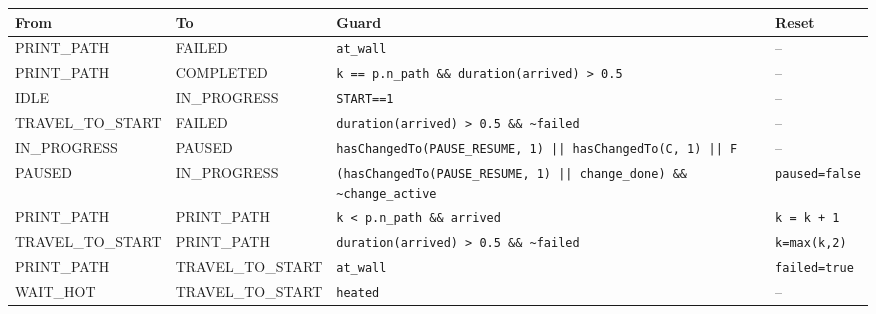 \begin{tabular}{@{}llp{}p{}@{}}
\toprule
From & To & Guard & Reset \\
\midrule
PRINT\_PATH & FAILED & \texttt{at\_wall} & -- \\
PRINT\_PATH & COMPLETED & \texttt{k == p.n\_path \&\& duration(arrived) > 0.5} & -- \\
IDLE & IN\_PROGRESS & \texttt{START==1} & -- \\
TRAVEL\_TO\_START & FAILED & \texttt{duration(arrived) > 0.5 \&\& \textasciitilde{}failed} & -- \\
IN\_PROGRESS & PAUSED & \texttt{hasChangedTo(PAUSE\_RESUME, 1) || hasChangedTo(C, 1) || F} & -- \\
PAUSED & IN\_PROGRESS & \texttt{(hasChangedTo(PAUSE\_RESUME, 1) || change\_done) \&\& \textasciitilde{}change\_active} & \texttt{paused=false} \\
PRINT\_PATH & PRINT\_PATH & \texttt{k < p.n\_path \&\& arrived} & \texttt{k = k + 1} \\
TRAVEL\_TO\_START & PRINT\_PATH & \texttt{duration(arrived) > 0.5 \&\& \textasciitilde{}failed} & \texttt{k=max(k,2)} \\
PRINT\_PATH & TRAVEL\_TO\_START & \texttt{at\_wall} & \texttt{failed=true} \\
WAIT\_HOT & TRAVEL\_TO\_START & \texttt{heated} & -- \\
\bottomrule
\end{tabular}
